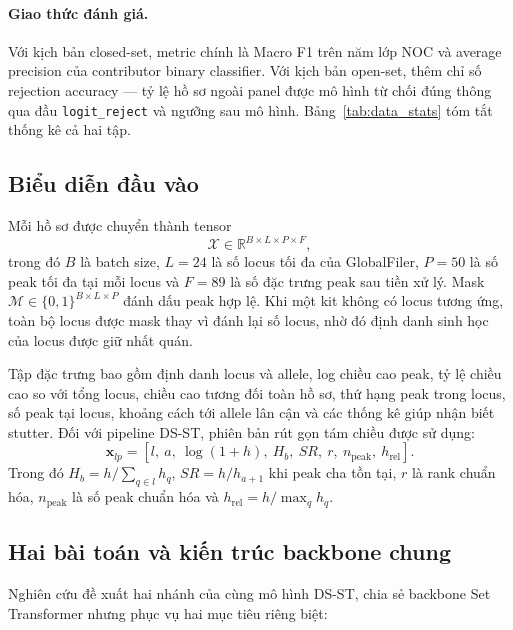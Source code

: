 \documentclass[12pt,a4paper]{article}
\begin{document}
\paragraph{Giao thức đánh giá.}
Với kịch bản closed-set, metric chính là Macro F1 trên năm lớp NOC và average precision của contributor binary classifier. Với kịch bản open-set, thêm chỉ số rejection accuracy — tỷ lệ hồ sơ ngoài panel được mô hình từ chối đúng thông qua đầu \texttt{logit\_reject} và ngưỡng sau mô hình. Bảng~\ref{tab:data_stats} tóm tắt thống kê cả hai tập.

\subsection{Biểu diễn đầu vào}

Mỗi hồ sơ được chuyển thành tensor
\begin{equation}
\mathcal{X}\in\mathbb{R}^{B\times L\times P\times F},
\end{equation}
trong đó \(B\) là batch size, \(L=24\) là số locus tối đa của GlobalFiler, \(P=50\) là số peak tối đa tại mỗi locus và \(F=89\) là số đặc trưng peak sau tiền xử lý. Mask
\(\mathcal{M}\in\{0,1\}^{B\times L\times P}\) đánh dấu peak hợp lệ. Khi một kit không có locus tương ứng, toàn bộ locus được mask thay vì đánh lại số locus, nhờ đó định danh sinh học của locus được giữ nhất quán.

Tập đặc trưng bao gồm định danh locus và allele, log chiều cao peak, tỷ lệ chiều cao so với tổng locus, chiều cao tương đối toàn hồ sơ, thứ hạng peak trong locus, số peak tại locus, khoảng cách tới allele lân cận và các thống kê giúp nhận biết stutter. Đối với pipeline DS-ST, phiên bản rút gọn tám chiều được sử dụng:
\begin{equation}
\bm{x}_{lp}=
\left[l,\ a,\ \log(1+h),\ H_b,\ SR,\ r,\ n_{\mathrm{peak}},\ h_{\mathrm{rel}}\right].
\end{equation}
Trong đó \(H_b=h/\sum_{q\in l}h_q\), \(SR=h/h_{a+1}\) khi peak cha tồn tại, \(r\) là rank chuẩn hóa, \(n_{\mathrm{peak}}\) là số peak chuẩn hóa và \(h_{\mathrm{rel}}=h/\max_q h_q\).

\subsection{Hai bài toán và kiến trúc backbone chung}

Nghiên cứu đề xuất hai nhánh của cùng mô hình DS-ST, chia sẻ backbone Set Transformer nhưng phục vụ hai mục tiêu riêng biệt:
\end{document}
